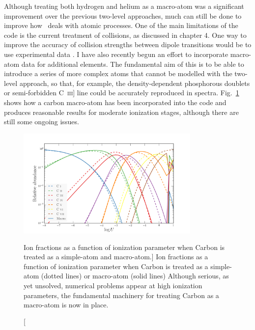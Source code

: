 Although treating both hydrogen and helium as a macro-atom was
a significant improvement over the previous two-level approaches, 
much can still be done to improve how \py\ deals with atomic processes.
One of the main limitations of the code is the current treatment of
collisions, as discussed in chapter 4. One way to improve the accuracy
of collision strengths between dipole transitions would be to use
experimental data \citep[e.g.][]{gaetz1983}. 
I have also recently begun an effort to incorporate macro-atom data for
additional elements. The fundamental aim of this is to
be able to introduce a series of more complex atoms that cannot be modelled 
with the two-level approach, so that, for example, the density-dependent 
phosphorous doublets or semi-forbidden C~\textsc{iii}] 
line could be accurately reproduced in spectra. 
Fig.~\ref{fig:carbon_matom} shows how a carbon macro-atom
has been incorporated into the code and produces reasonable results for moderate
ionization stages, although there are still some ongoing issues.

\begin{figure} 
\centering
\includegraphics[width=0.8\textwidth]{figures/ewpaper/carbon_matom_ion.png}
\caption
[Ion fractions as a function of ionization parameter when 
Carbon is treated as a simple-atom and macro-atom.]
{
Ion fractions as a function of ionization parameter when 
Carbon is treated as a simple-atom (dotted lines) or macro-atom (solid lines)
Although serious, as yet unsolved, numerical problems appear at 
high ionization parameters, the fundamental machinery for treating
Carbon as a macro-atom is now in place.
}
\label{fig:carbon_matom}
\end{figure} 


